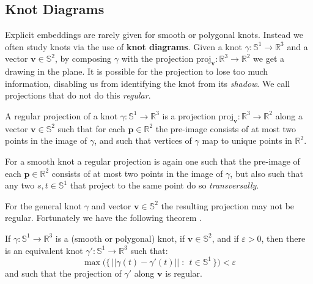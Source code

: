     \subsection{Knot Diagrams}
        Explicit embeddings are rarely given for smooth or polygonal knots.
        Instead we often study knots via the use of \textbf{knot diagrams}.
        Given a knot $\gamma:\mathbb{S}^{1}\rightarrow\mathbb{R}^{3}$ and a
        vector $\mathbf{v}\in\mathbb{S}^{2}$, by composing $\gamma$ with the
        projection
        $\textrm{proj}_{\mathbf{v}}:\mathbb{R}^{3}\rightarrow\mathbb{R}^{2}$ we
        get a drawing in the plane. It is possible for the projection to lose
        too much information, disabling us from identifying the knot from its
        \textit{shadow}. We call projections that do not do this
        \textit{regular}.
        \begin{definition}
            A regular projection of a knot
            $\gamma:\mathbb{S}^{1}\rightarrow\mathbb{R}^{3}$ is a projection
            $\textrm{proj}_{\mathbf{v}}:\mathbb{R}^{3}\rightarrow\mathbb{R}^{2}$
            along a vector $\mathbf{v}\in\mathbb{S}^{2}$ such that for each
            $\mathbf{p}\in\mathbb{R}^{2}$ the pre-image consists of at most two
            points in the image of $\gamma$, and such that vertices of
            $\gamma$ map to unique points in $\mathbb{R}^{2}$.
        \end{definition}
        For a smooth knot a regular projection is again one such that the
        pre-image of each $\mathbf{p}\in\mathbb{R}^{2}$ consists of at most two
        points in the image of $\gamma$, but also such that any two
        $s,t\in\mathbb{S}^{1}$ that project to the same point do so
        \textit{transversally}.
        \par\hfill\par
        For the general knot $\gamma$ and vector $\mathbf{v}\in\mathbb{S}^{2}$
        the resulting projection may not be regular. Fortunately we have the
        following theorem \cite[p.~22]{LivingstonKnotTheory}.
        \begin{theorem}
            If $\gamma:\mathbb{S}^{1}\rightarrow\mathbb{R}^{3}$ is a
            (smooth or polygonal) knot, if $\mathbf{v}\in\mathbb{S}^{2}$, and if
            $\varepsilon>0$, then there is an equivalent knot
            $\gamma':\mathbb{S}^{1}\rightarrow\mathbb{R}^{3}$ such that:
            \begin{equation}
                \max\big(
                    \{\,||\gamma(t)-\gamma'(t)||\;:\;\,t\in\mathbb{S}^{1}\,\}
                \big)<\varepsilon
            \end{equation}
            and such that the projection of $\gamma'$ along $\mathbf{v}$
            is regular.
        \end{theorem}
